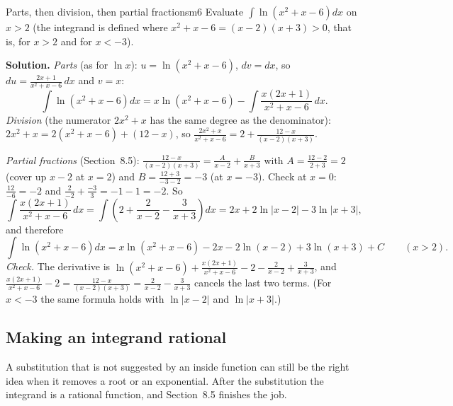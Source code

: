 \documentclass[11pt]{article}
\begin{document}
\begin{exmp}{Parts, then division, then partial fractions}{m6}
Evaluate $\displaystyle\int\ln\left(x^2+x-6\right)dx$ on $x>2$ (the integrand is defined where $x^2+x-6=(x-2)(x+3)>0$, that is, for $x>2$ and for $x<-3$).

\textbf{Solution.} \emph{Parts} (as for $\ln x$): $u=\ln(x^2+x-6)$, $dv=dx$, so $du=\frac{2x+1}{x^2+x-6}\,dx$ and $v=x$:
\[\int\ln\left(x^2+x-6\right)dx=x\ln\left(x^2+x-6\right)-\int\frac{x(2x+1)}{x^2+x-6}\,dx .\]
\emph{Division} (the numerator $2x^2+x$ has the same degree as the denominator): $2x^2+x=2(x^2+x-6)+(12-x)$, so $\frac{2x^2+x}{x^2+x-6}=2+\frac{12-x}{(x-2)(x+3)}$.

\emph{Partial fractions} (Section~8.5): $\frac{12-x}{(x-2)(x+3)}=\frac A{x-2}+\frac B{x+3}$ with $A=\frac{12-2}{2+3}=2$ (cover up $x-2$ at $x=2$) and $B=\frac{12+3}{-3-2}=-3$ (at $x=-3$). Check at $x=0$: $\frac{12}{-6}=-2$ and $\frac2{-2}+\frac{-3}3=-1-1=-2$. So
\[\int\frac{x(2x+1)}{x^2+x-6}\,dx=\int\left(2+\frac2{x-2}-\frac3{x+3}\right)dx=2x+2\ln\lvert x-2\rvert-3\ln\lvert x+3\rvert,\]
and therefore
\[\int\ln\left(x^2+x-6\right)dx=x\ln\left(x^2+x-6\right)-2x-2\ln(x-2)+3\ln(x+3)+C\qquad(x>2).\]
\emph{Check.} The derivative is $\ln(x^2+x-6)+\frac{x(2x+1)}{x^2+x-6}-2-\frac2{x-2}+\frac3{x+3}$, and $\frac{x(2x+1)}{x^2+x-6}-2=\frac{12-x}{(x-2)(x+3)}=\frac2{x-2}-\frac3{x+3}$ cancels the last two terms. (For $x<-3$ the same formula holds with $\ln\lvert x-2\rvert$ and $\ln\lvert x+3\rvert$.)
\end{exmp}

\subsection*{Making an integrand rational}

A substitution that is not suggested by an inside function can still be the right idea when it removes a root or an exponential. After the substitution the integrand is a rational function, and Section~8.5 finishes the job.
\end{document}
